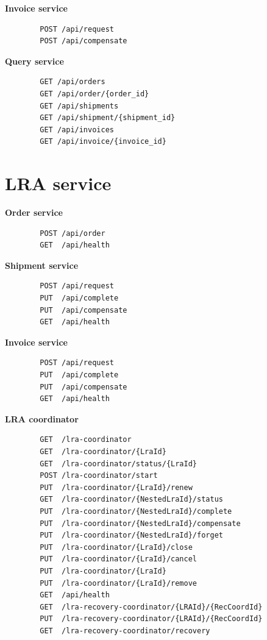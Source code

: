\documentclass[oneside,
  digital, %
  table,   %
  nolof,     %
  nolot,     %
]{fithesis3}
\begin{document}
\noindent
\textbf{Invoice service}

\begin{verbatim}
        POST /api/request
        POST /api/compensate
\end{verbatim}

\noindent
\textbf{Query service}

\begin{verbatim}
        GET /api/orders
        GET /api/order/{order_id}
        GET /api/shipments
        GET /api/shipment/{shipment_id}
        GET /api/invoices
        GET /api/invoice/{invoice_id}
\end{verbatim}

\section{LRA service}

\textbf{Order service}

\begin{verbatim}
        POST /api/order
        GET  /api/health
\end{verbatim}

\noindent
\textbf{Shipment service}

\begin{verbatim}
        POST /api/request
        PUT  /api/complete
        PUT  /api/compensate
        GET  /api/health
\end{verbatim}

\noindent
\textbf{Invoice service}

\begin{verbatim}
        POST /api/request
        PUT  /api/complete
        PUT  /api/compensate
        GET  /api/health
\end{verbatim}

\noindent
\textbf{LRA coordinator}

\begin{verbatim}
        GET  /lra-coordinator
        GET  /lra-coordinator/{LraId}
        GET  /lra-coordinator/status/{LraId}
        POST /lra-coordinator/start
        PUT  /lra-coordinator/{LraId}/renew
        GET  /lra-coordinator/{NestedLraId}/status
        PUT  /lra-coordinator/{NestedLraId}/complete
        PUT  /lra-coordinator/{NestedLraId}/compensate
        PUT  /lra-coordinator/{NestedLraId}/forget
        PUT  /lra-coordinator/{LraId}/close
        PUT  /lra-coordinator/{LraId}/cancel
        PUT  /lra-coordinator/{LraId}
        PUT  /lra-coordinator/{LraId}/remove
        GET  /api/health
        GET  /lra-recovery-coordinator/{LRAId}/{RecCoordId}
        PUT  /lra-recovery-coordinator/{LRAId}/{RecCoordId}
        GET  /lra-recovery-coordinator/recovery
\end{verbatim}
\end{document}
